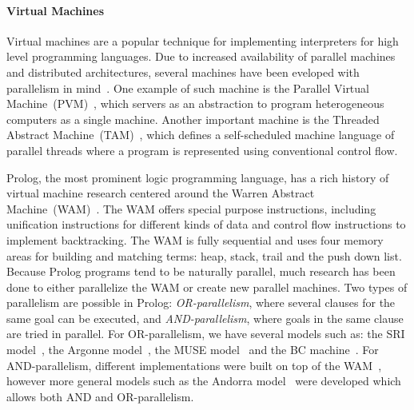 \paragraph{Virtual Machines}

Virtual machines are a popular technique for implementing interpreters for high
level programming languages. Due to increased availability of parallel machines
and distributed architectures, several machines have been eveloped with
parallelism in mind~\cite{Kara:1997:AMM:265274}. One example of such machine is
the Parallel Virtual Machine~(PVM)~\cite{Sunderam90pvm:a}, which servers as an
abstraction to program heterogeneous computers as a single machine. Another
important machine is the Threaded Abstract
Machine~(TAM)~\cite{CullerGSvE93,goldstein-tr94}, which defines a self-scheduled
machine language of parallel threads where a program is represented using
conventional control flow.

Prolog, the most prominent logic programming language, has a rich history of
virtual machine research centered around the Warren Abstract
Machine~(WAM)~\cite{AICPub641:1983}. The WAM offers special purpose
instructions, including unification instructions for different kinds of data and
control flow instructions to implement backtracking. The WAM is fully sequential
and uses four memory areas for building and matching terms: heap, stack, trail
and the push down list. Because Prolog programs tend to be naturally parallel,
much research has been done to either parallelize the WAM or create new parallel
machines. Two types of parallelism are possible in Prolog:
\emph{OR-parallelism}, where several clauses for the same goal can be executed,
and \emph{AND-parallelism}, where goals in the same clause are tried in
parallel. For OR-parallelism, we have several models such as: the SRI
model~\cite{Warren:1987:OEM:67683.67699}, the Argonne
model~\cite{ButlerDLOOS88}, the MUSE model~\cite{Ali:1990fk} and the BC
machine~\cite{Ali88}. For AND-parallelism, different implementations were built
on top of the WAM~\cite{Hermenegildo:1986:AMB:913061,Lin:1988:AEL:900478},
however more general models such as the Andorra
model~\cite{Haridi:1990:KAP:87961.87964} were developed which allows both AND
and OR-parallelism.

